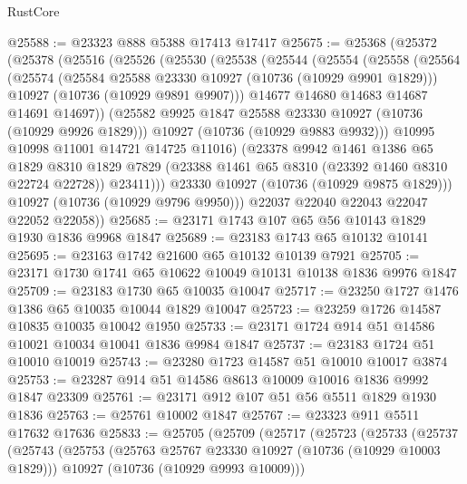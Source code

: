 \begin{lexlean}{RustCore}
\begin{coremodule}
@25588 := @23323 @888 @5388 @17413 @17417
@25675 := @25368
    (@25372
      (@25378
        (@25516
          (@25526
            (@25530
              (@25538
                (@25544
                  (@25554
                    (@25558
                      (@25564
                        (@25574
                          (@25584 @25588 @23330 @10927 (@10736 (@10929 @9901 @1829)))
                          @10927
                          (@10736 (@10929 @9891 @9907)))
                        @14677
                        @14680
                        @14683
                        @14687
                        @14691
                        @14697))
                    (@25582 @9925 @1847 @25588 @23330 @10927 (@10736 (@10929 @9926 @1829)))
                    @10927
                    (@10736 (@10929 @9883 @9932)))
                  @10995
                  @10998
                  @11001
                  @14721
                  @14725
                  @11016)
                (@23378
                  @9942
                  @1461
                  @1386
                  @65
                  @1829
                  @8310
                  @1829
                  @7829
                  (@23388 @1461 @65 @8310 (@23392 @1460 @8310 @22724 @22728))
                  @23411)))
            @23330
            @10927
            (@10736 (@10929 @9875 @1829)))
          @10927
          (@10736 (@10929 @9796 @9950)))
        @22037
        @22040
        @22043
        @22047
        @22052
        @22058))
@25685 := @23171 @1743 @107 @65 @56 @10143 @1829 @1930 @1836 @9968 @1847
@25689 := @23183 @1743 @65 @10132 @10141
@25695 := @23163 @1742 @21600 @65 @10132 @10139 @7921
@25705 := @23171 @1730 @1741 @65 @10622 @10049 @10131 @10138 @1836 @9976 @1847
@25709 := @23183 @1730 @65 @10035 @10047
@25717 := @23250 @1727 @1476 @1386 @65 @10035 @10044 @1829 @10047
@25723 := @23259 @1726 @14587 @10835 @10035 @10042 @1950
@25733 := @23171 @1724 @914 @51 @14586 @10021 @10034 @10041 @1836 @9984 @1847
@25737 := @23183 @1724 @51 @10010 @10019
@25743 := @23280 @1723 @14587 @51 @10010 @10017 @3874
@25753 := @23287 @914 @51 @14586 @8613 @10009 @10016 @1836 @9992 @1847 @23309
@25761 := @23171 @912 @107 @51 @56 @5511 @1829 @1930 @1836
@25763 := @25761 @10002 @1847
@25767 := @23323 @911 @5511 @17632 @17636
@25833 := @25705
    (@25709
      (@25717
        (@25723
          (@25733
            (@25737
              (@25743
                (@25753
                  (@25763 @25767 @23330 @10927 (@10736 (@10929 @10003 @1829)))
                  @10927
                  (@10736 (@10929 @9993 @10009)))

\end{coremodule}
\end{lexlean}
